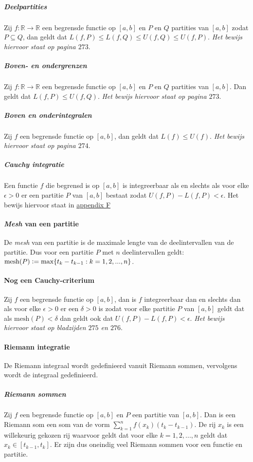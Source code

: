 \subparagraph{Deelpartities} Zij $f:\mathbb{R}\to\mathbb{R}$ een begrensde functie op $[a,b]$ en $P$ en $Q$ partities van $[a,b]$ zodat $P\subseteq Q$, dan geldt dat $L(f,P)\leq L(f,Q)\leq U(f,Q)\leq U(f,P)$. \textit{Het bewijs hiervoor staat op pagina $273$}.

\subparagraph{Boven- en ondergrenzen} Zij $f:\mathbb{R}\to\mathbb{R}$ een begrensde functie op $[a,b]$ en $P$ en $Q$ partities van $[a,b]$. Dan geldt dat $L(f,P)\leq U(f,Q)$. \textit{Het bewijs hiervoor staat op pagina $273$}.

\subparagraph{Boven en onderintegralen} Zij $f$ een begrensde functie op $[a,b]$, dan geldt dat $L(f)\leq U(f)$. \textit{Het bewijs hiervoor staat op pagina $274$}.

\subparagraph{Cauchy integratie} Een functie $f$ die begrensd is op $[a,b]$ is integreerbaar als en slechts als voor elke $\epsilon>0$ er een partitie $P$ van $[a,b]$ bestaat zodat $U(f,P)-L(f,P)<\epsilon$. Het bewijs hiervoor staat in \hyperref[sec:AF]{appendix F}

\paragraph{\textit{Mesh} van een partitie} De \textit{mesh} van een partitie is de maximale lengte van de deelintervallen van de partitie. Dus voor een partitie $P$ met $n$ deelintervallen geldt: $\text{mesh}(P)\vcentcolon=\text{max}\{t_{k}-t_{k-1}:k=1,2,...,n\}$.

\paragraph{Nog een Cauchy-criterium} Zij $f$ een begrensde functie op $[a,b]$, dan is $f$ integreerbaar dan en slechts dan als voor elke $\epsilon>0$ er een $\delta>0$ is zodat voor elke partitie $P$ van $[a,b]$ geldt dat als $\text{mesh}(P)<\delta$ dan geldt ook dat $U(f,P)-L(f,P)<\epsilon$. \textit{Het bewijs hiervoor staat op bladzijden $275$ en $276$}.

\paragraph{Riemann integratie} De Riemann integraal wordt gedefinieerd vanuit Riemann sommen, vervolgens wordt de integraal gedefinieerd.

\subparagraph{Riemann sommen} Zij $f$ een begrensde functie op $[a,b]$ en $P$ een partitie van $[a,b]$. Dan is een Riemann som een som van de vorm $\sum\limits_{k=1}^{n}f(x_{k})(t_{k}-t_{k-1})$. De rij $x_{k}$ is een willekeurig gekozen rij waarvoor geldt dat voor elke $k=1,2,...,n$ geldt dat $x_{k}\in[t_{k-1},t_{k}]$. Er zijn dus oneindig veel Riemann sommen voor een functie en partitie.

